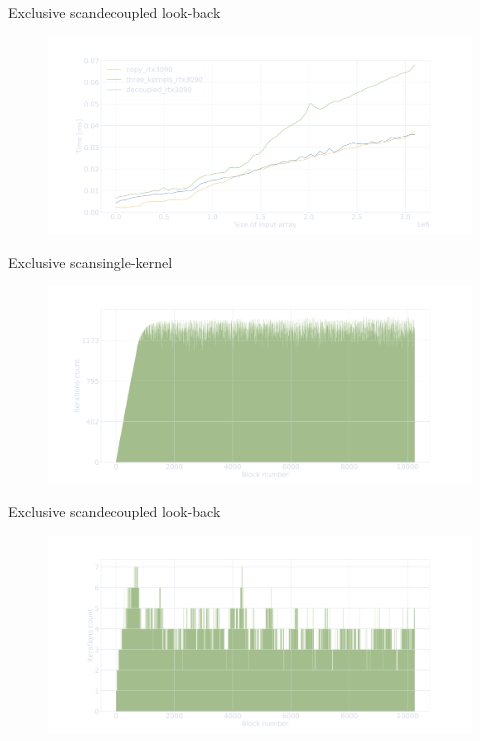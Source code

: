 \documentclass[aspectratio=169,compress]{beamer}
\begin{document}
\begin{frame}[fragile]{Exclusive scan}{decoupled look-back}
\centering
	\begin{figure}
		\includegraphics[width=\textwidth]{decoupled.pdf}
	\end{figure}
\end{frame}

\begin{frame}[fragile]{Exclusive scan}{single-kernel}
\centering
	\begin{figure}
		\includegraphics[width=\textwidth]{mp_hist.pdf}
	\end{figure}
\end{frame}

\begin{frame}[fragile]{Exclusive scan}{decoupled look-back}
\centering
	\begin{figure}
		\includegraphics[width=\textwidth]{decoupled_hist.pdf}
	\end{figure}
\end{frame}
\end{document}

